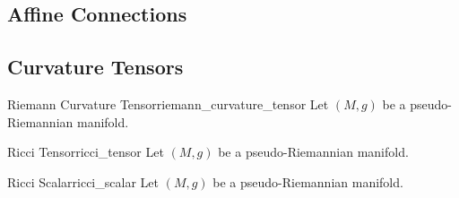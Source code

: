 \documentclass{article}
\begin{document}
\subsection{Affine Connections}

\subsection{Curvature Tensors}

\begin{definition}{Riemann Curvature Tensor}{riemann_curvature_tensor}
    Let $(M,g)$ be a pseudo-Riemannian manifold.
\end{definition}

\begin{definition}{Ricci Tensor}{ricci_tensor}
    Let $(M,g)$ be a pseudo-Riemannian manifold.
\end{definition}

\begin{definition}{Ricci Scalar}{ricci_scalar}
    Let $(M,g)$ be a pseudo-Riemannian manifold.
\end{definition}

% 
% 
\end{document}
